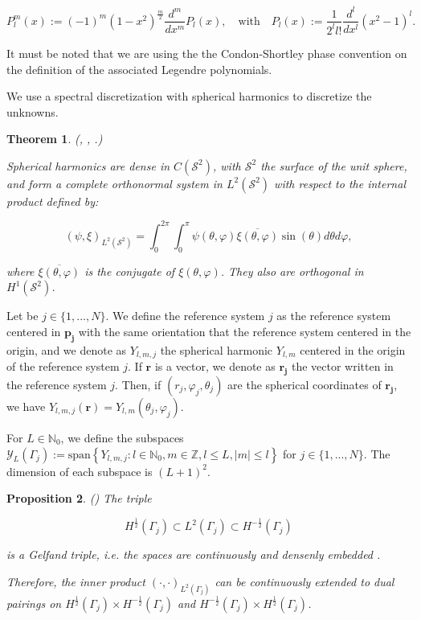\documentclass[]{article}%
\newtheorem{theorem}{Theorem}[section]
\newtheorem{proposition}[theorem]{Proposition}
\begin{document}
 $$P_{l}^m\left(x\right) := (-1)^m \left( 1- x^2\right)^{\frac{m}{2}} \frac{d^m}{dx^m}P_l(x), \quad \mbox{with} \quad P_{l}\left(x\right) := \frac{1}{2^ll!}\frac{d^l}{dx^l}(x^2-1)^l.$$

It must be noted that we are using the the Condon-Shortley phase convention on the definition of the associated Legendre polynomials.

We use a spectral discretization with spherical harmonics to discretize the unknowns.

\begin{theorem}
(\cite[Section 2.8]{AtkinsonHan2012}, \cite[Theorem 2.4.4]{Nedelec2001}, \cite[Section 2.3]{ColtonKress2013a}.)

Spherical harmonics are dense in $C(\mathcal{S}^2)$, with $\mathcal{S}^2$ the surface of the unit sphere, and form a complete orthonormal system in $L^2(\mathcal{S}^2)$ with respect to the internal product defined by:

\begin{equation}
\left( \psi , \xi \right)_{L^2(\mathcal{S}^2)} = \int_{0}^{2\pi}\int_{0}^{\pi} \psi\left(\theta,\varphi\right) \overline{\xi\left(\theta,\varphi\right)} \sin\left(\theta\right) d\theta d\varphi,
\end{equation}

where $\overline{\xi\left(\theta,\varphi\right)}$ is the conjugate of $\xi\left(\theta,\varphi\right)$. They also are orthogonal in $H^1(\mathcal{S}^2)$.
\end{theorem}

Let be $j\in \{1,...,N\}$. We define the reference system $j$ as the reference system centered in $\mathbf{p_j}$ with the same orientation that the reference system centered in the origin, and we denote as $Y_{l,m,j}$ the spherical harmonic $Y_{l,m}$ centered in the origin of the reference system $j$. If $\mathbf{r}$ is a vector, we denote as $\mathbf{r_j}$ the vector  written in the reference system $j$. Then, if $\left( r_j, \varphi_j, \theta_j \right)$ are the spherical coordinates of $\mathbf{r_j}$, we have $Y_{l,m,j}\left(\mathbf{r}\right)=Y_{l,m}\left(\theta_j, \varphi_j\right)$.

For $L \in \mathbb{N}_0$, we define the subspaces $\mathcal{Y}_L\left(\Gamma_j \right):= \mbox{span}\left\lbrace Y_{l,m,j}: l \in \mathbb{N}_0, m \in \mathbb{Z}, l \leq L, |m|\leq l \right\rbrace$ for $j \in \lbrace 1, ... , N \rbrace $. The dimension of each subspace is $(L+1)^2$.

\begin{proposition}\label{Gelfand}
 (\cite[Proposition 2.5.2 and Section 2.1.2.4]{SauterSchwab2010}) The triple

 $$H^{\frac{1}{2}}(\Gamma_j) \subset L^2(\Gamma_j) \subset H^{-\frac{1}{2}}(\Gamma_j) $$

 is a Gelfand triple, i.e. the spaces are continuously and densenly embedded .

 Therefore, the inner product $(\cdot, \cdot )_{L^2(\Gamma_j)} $ can be continuously extended to dual pairings on $H^{\frac{1}{2}}(\Gamma_j) \times H^{-\frac{1}{2}}(\Gamma_j)$ and $H^{-\frac{1}{2}}(\Gamma_j) \times H^{\frac{1}{2}}(\Gamma_j)$.
\end{proposition}
\end{document}
